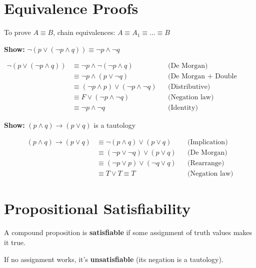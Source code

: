 \documentclass[11pt,a4paper]{article}
\begin{document}
\newpage

\section{Equivalence Proofs}

To prove $A \equiv B$, chain equivalences: $A \equiv A_1 \equiv \ldots \equiv B$

\begin{examplebox}
\textbf{Show:} $\neg(p \lor (\neg p \land q)) \equiv \neg p \land \neg q$

\begin{align*}
\neg(p \lor (\neg p \land q)) &\equiv \neg p \land \neg(\neg p \land q) && \text{(De Morgan)} \\
&\equiv \neg p \land (p \lor \neg q) && \text{(De Morgan + Double Neg)} \\
&\equiv (\neg p \land p) \lor (\neg p \land \neg q) && \text{(Distributive)} \\
&\equiv F \lor (\neg p \land \neg q) && \text{(Negation law)} \\
&\equiv \neg p \land \neg q && \text{(Identity)}
\end{align*}
\end{examplebox}

\begin{examplebox}
\textbf{Show:} $(p \land q) \to (p \lor q)$ is a tautology

\begin{align*}
(p \land q) \to (p \lor q) &\equiv \neg(p \land q) \lor (p \lor q) && \text{(Implication)} \\
&\equiv (\neg p \lor \neg q) \lor (p \lor q) && \text{(De Morgan)} \\
&\equiv (\neg p \lor p) \lor (\neg q \lor q) && \text{(Rearrange)} \\
&\equiv T \lor T \equiv T && \text{(Negation law)}
\end{align*}
\end{examplebox}

\section{Propositional Satisfiability}

\begin{definitionbox}[Satisfiability]
A compound proposition is \textbf{satisfiable} if some assignment of truth values makes it true.

If no assignment works, it's \textbf{unsatisfiable} (its negation is a tautology).
\end{definitionbox}
\end{document}
